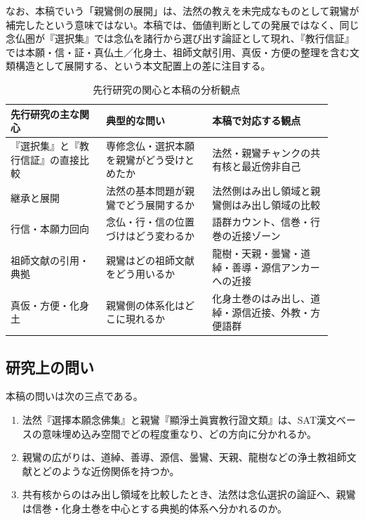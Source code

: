 \documentclass[uplatex,dvipdfmx,11pt,a4paper]{jsarticle}
\begin{document}
なお、本稿でいう「親鸞側の展開」は、法然の教えを未完成なものとして親鸞が補完したという意味ではない。本稿では、価値判断としての発展ではなく、同じ念仏圏が『選択集』では念仏を諸行から選び出す論証として現れ、『教行信証』では本願・信・証・真仏土／化身土、祖師文献引用、真仮・方便の整理を含む文類構造として展開する、という本文配置上の差に注目する。

\begin{table}[H]
\centering
\small
\caption{先行研究の関心と本稿の分析観点}
\label{tab:prior-research-positioning}
\begin{tabular}{@{}p{0.27\linewidth}p{0.30\linewidth}p{0.34\linewidth}@{}}
\toprule
先行研究の主な関心 & 典型的な問い & 本稿で対応する観点 \\
\midrule
『選択集』と『教行信証』の直接比較 & 専修念仏・選択本願を親鸞がどう受けとめたか & 法然・親鸞チャンクの共有核と最近傍非自己 \\
継承と展開 & 法然の基本問題が親鸞でどう展開するか & 法然側はみ出し領域と親鸞側はみ出し領域の比較 \\
行信・本願力回向 & 念仏・行・信の位置づけはどう変わるか & 語群カウント、信巻・行巻の近接ゾーン \\
祖師文献の引用・典拠 & 親鸞はどの祖師文献をどう用いるか & 龍樹・天親・曇鸞・道綽・善導・源信アンカーへの近接 \\
真仮・方便・化身土 & 親鸞側の体系化はどこに現れるか & 化身土巻のはみ出し、道綽・源信近接、外教・方便語群 \\
\bottomrule
\end{tabular}
\end{table}

\subsection{研究上の問い}

本稿の問いは次の三点である。

\begin{enumerate}
  \item 法然『選擇本願念佛集』と親鸞『顯淨土眞實教行證文類』は、SAT漢文ベースの意味埋め込み空間でどの程度重なり、どの方向に分かれるか。
  \item 親鸞の広がりは、道綽、善導、源信、曇鸞、天親、龍樹などの浄土教祖師文献とどのような近傍関係を持つか。
  \item 共有核からのはみ出し領域を比較したとき、法然は念仏選択の論証へ、親鸞は信巻・化身土巻を中心とする典拠的体系へ分かれるのか。
\end{enumerate}
\end{document}

